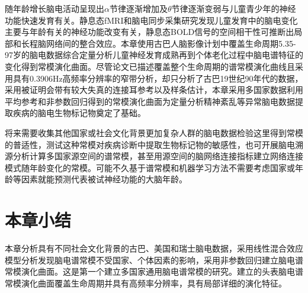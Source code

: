 随年龄增长脑电活动呈现出$\alpha$节律逐渐增加及$\theta$节律逐渐变弱与儿童青少年的神经功能快速发育有关。静息态fMRI和脑电同步采集研究发现儿童发育中的脑电变化主要与年龄有关的神经功能改变有关，静息态BOLD信号的空间相干性可推断出局部和长程脑网络间的整合效应。本章使用古巴人脑影像计划中覆盖生命周期5.35-97岁的脑电数据综合定量分析儿童神经发育成熟再到个体老化过程中脑电谱特征的变化得到常模演化曲面。尽管论文已描述覆盖整个生命周期的谱常模演化曲线且采用具有0.3906Hz高频率分辨率的窄带分析，却只分析了古巴19世纪90年代的数据，采用被证明会带有较大失真的连接耳参考以及样条估计，本章采用多国家数据利用平均参考和非参数回归得到的常模演化曲面为定量分析精神紊乱等异常脑电数据提取疾病的脑电生物标记物奠定了基础。

将来需要收集其他国家或社会文化背景更加复杂人群的脑电数据检验这里得到常模的普适性，测试这种常模对疾病诊断中提取生物标记物的敏感性，也可开展脑电溯源分析计算多国家源空间的谱常模，甚至用源空间的脑网络连接指标建立网络连接模式随年龄变化的常模。可能不久基于谱常模和机器学习方法不需要考虑国家或年龄等因素就能预测代表被试神经功能的大脑年龄。
\section{本章小结}
本章分析具有不同社会文化背景的古巴、美国和瑞士脑电数据，采用线性混合效应模型分析发现脑电谱常模不受国家、个体因素的影响，采用非参数回归建立脑电谱常模演化曲面。这是第一个建立多国家通用脑电谱常模的研究。建立的头表脑电谱常模演化曲面覆盖生命周期并具有高频率分辨率，具有局部详细的演化特征。